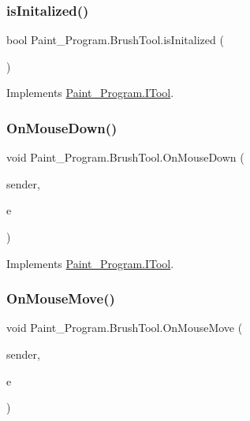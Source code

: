 \subsubsection{\texorpdfstring{is\+Initalized()}{isInitalized()}}
{\footnotesize\ttfamily bool Paint\+\_\+\+Program.\+Brush\+Tool.\+is\+Initalized (\begin{DoxyParamCaption}{ }\end{DoxyParamCaption})\hspace{0.3cm}{\ttfamily [inline]}}



Implements \mbox{\hyperlink{interface_paint___program_1_1_i_tool_a951b844bcbf47a6c306104fa86be7a5d}{Paint\+\_\+\+Program.\+I\+Tool}}.

\mbox{\label{class_paint___program_1_1_brush_tool_a66b7dbcbb7af665e48b14d9e70a8d22d}} 
\subsubsection{\texorpdfstring{On\+Mouse\+Down()}{OnMouseDown()}}
{\footnotesize\ttfamily void Paint\+\_\+\+Program.\+Brush\+Tool.\+On\+Mouse\+Down (\begin{DoxyParamCaption}\item[{object}]{sender,  }\item[{Mouse\+Event\+Args}]{e }\end{DoxyParamCaption})\hspace{0.3cm}{\ttfamily [inline]}}



Implements \mbox{\hyperlink{interface_paint___program_1_1_i_tool_a73d8797f4f2b1e0d8efe8aadcd44e840}{Paint\+\_\+\+Program.\+I\+Tool}}.

\mbox{\label{class_paint___program_1_1_brush_tool_a4246e31217a616bf6bd251ac2b7ac4e3}} 
\subsubsection{\texorpdfstring{On\+Mouse\+Move()}{OnMouseMove()}}
{\footnotesize\ttfamily void Paint\+\_\+\+Program.\+Brush\+Tool.\+On\+Mouse\+Move (\begin{DoxyParamCaption}\item[{object}]{sender,  }\item[{Mouse\+Event\+Args}]{e }\end{DoxyParamCaption})\hspace{0.3cm}{\ttfamily [inline]}}



